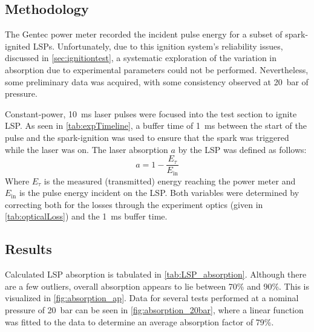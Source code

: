         \subsection{Methodology}
            The Gentec power meter recorded the incident pulse energy for a subset of spark-ignited LSPs. Unfortunately, due to this ignition system's reliability issues, discussed in \autoref{sec:ignitiontest}, a systematic exploration of the variation in absorption due to experimental parameters could not be performed. Nevertheless, some preliminary data was acquired, with some consistency observed at \qty{20}{bar} of pressure.

            Constant-power, \qty{10}{ms} laser pulses were focused into the test section to ignite LSP. As seen in \autoref{tab:expTimeline}, a buffer time of \qty{1}{ms} between the start of the pulse and the spark-ignition was used to ensure that the spark was triggered while the laser was on. The laser absorption $a$ by the LSP was defined as follows:
            \begin{equation}
                a = 1-\frac{E_\tau}{E_\mathrm{in}}
            \end{equation}
            Where $E_\tau$ is the measured (transmitted) energy reaching the power meter and $E_\mathrm{in}$ is the pulse energy incident on the LSP. Both variables were determined by correcting both for the losses through the experiment optics (given in \autoref{tab:opticalLoss}) and the \qty{1}{ms} buffer time.

        \subsection{Results}
            Calculated LSP absorption is tabulated in \autoref{tab:LSP_absorption}. Although there are a few outliers, overall absorption appears to lie between 70\% and 90\%. This is visualized in \autoref{fig:absorption_ap}. Data for several tests performed at a nominal pressure of \qty{20}{bar} can be seen in \autoref{fig:absorption_20bar}, where a linear function was fitted to the data to determine an average absorption factor of 79\%.

            
            
